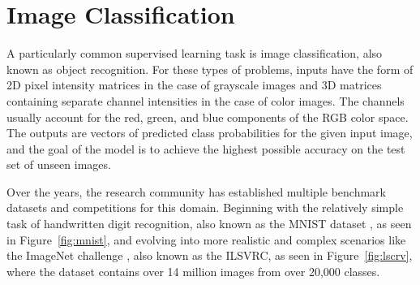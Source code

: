 \section{Image Classification}
A particularly common supervised learning task is image classification, also known as object recognition. For these types of problems, inputs have the form of 2D pixel intensity matrices in the case of grayscale images and 3D matrices containing separate channel intensities in the case of color images. The channels usually account for the red, green, and blue components of the RGB color space. The outputs are vectors of predicted class probabilities for the given input image, and the goal of the model is to achieve the highest possible accuracy on the test set of unseen images.

Over the years, the research community has established multiple benchmark datasets and competitions for this domain. Beginning with the relatively simple task of handwritten digit recognition, also known as the \ac{MNIST} dataset \parencite{lecun2010mnist}, as seen in Figure~\ref{fig:mnist}, and evolving into more realistic and complex scenarios like the ImageNet challenge \parencite{russakovsky2015imagenet}, also known as the \ac{ILSVRC}, as seen in Figure~\ref{fig:lscrv}, where the dataset contains over 14 million images from over 20,000 classes.
